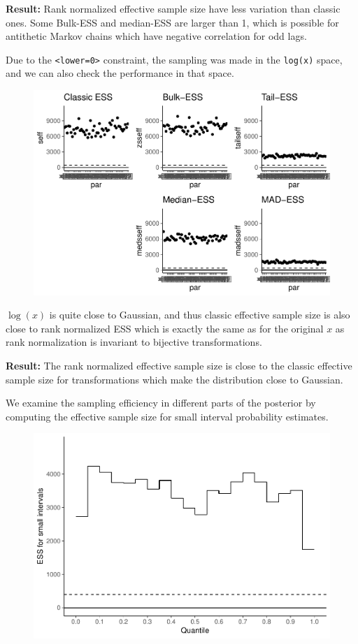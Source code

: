 \documentclass[american,]{article}
\begin{document}
\textbf{Result:} Rank normalized effective sample size have less
variation than classic ones. Some Bulk-ESS and median-ESS are larger
than 1, which is possible for antithetic Markov chains which have
negative correlation for odd lags.

Due to the \texttt{\textless{}lower=0\textgreater{}} constraint, the
sampling was made in the \texttt{log(x)} space, and we can also check
the performance in that space.

\begin{figure}[t]
  \centering
  \includegraphics[width=0.6\linewidth]{graphics/ess-fit-half-nom-2-1.pdf}
\end{figure}

\(\log(x)\) is quite close to Gaussian, and thus classic effective
sample size is also close to rank normalized ESS which is exactly the
same as for the original \(x\) as rank normalization is invariant to
bijective transformations.

\textbf{Result:} The rank normalized effective sample size is close to
the classic effective sample size for transformations which make the
distribution close to Gaussian.

We examine the sampling efficiency in different parts of the posterior
by computing the effective sample size for small interval probability
estimates.

\begin{figure}[t]
  \centering
  \includegraphics[width=0.6\linewidth]{graphics/local-ess-fit-half-nom-1.pdf}
\end{figure}
\end{document}
